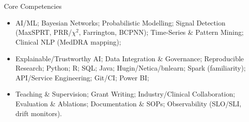 \section{\faBuilding}{Core Competencies}
\begin{itemize}[noitemsep]
    \item AI/ML; Bayesian Networks; Probabilistic Modelling; Signal Detection (MaxSPRT, PRR/$\chi^{2}$, Farrington, BCPNN); Time‑Series \& Pattern Mining; Clinical NLP (MedDRA mapping);
    \item Explainable/Trustworthy AI; Data Integration \& Governance; Reproducible Research; Python; R; SQL; Java; Hugin/Netica/bnlearn; Spark (familiarity); API/Service Engineering; Git/CI; Power BI;
    \item Teaching \& Supervision; Grant Writing; Industry/Clinical Collaboration; Evaluation \& Ablations; Documentation \& SOPs; Observability (SLO/SLI, drift monitors).

\end{itemize}